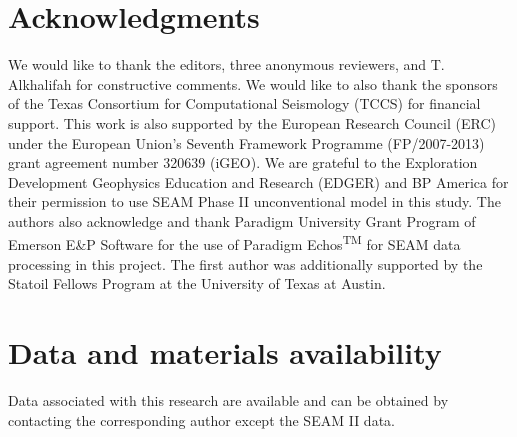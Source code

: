 \section{Acknowledgments}

We would like to thank the editors, three anonymous reviewers, and T. Alkhalifah for constructive comments. We would like to also thank the sponsors of the Texas Consortium for Computational Seismology (TCCS) for financial support. This work is also supported by the European Research Council (ERC) under the European Union's Seventh Framework Programme (FP/2007-2013) grant agreement number 320639 (iGEO). We are grateful to the Exploration Development Geophysics Education and Research (EDGER) and BP America for their permission to use SEAM Phase II unconventional model in this study. The authors also acknowledge and thank Paradigm University Grant Program of Emerson E\&P Software for the use of Paradigm Echos\textsuperscript{TM} for SEAM data processing in this project. The first author was additionally supported by the Statoil Fellows Program at the University of Texas at Austin. 

\section{Data and materials availability}

Data associated with this research are available and can be obtained by contacting the corresponding author except the SEAM II data.


\onecolumn


